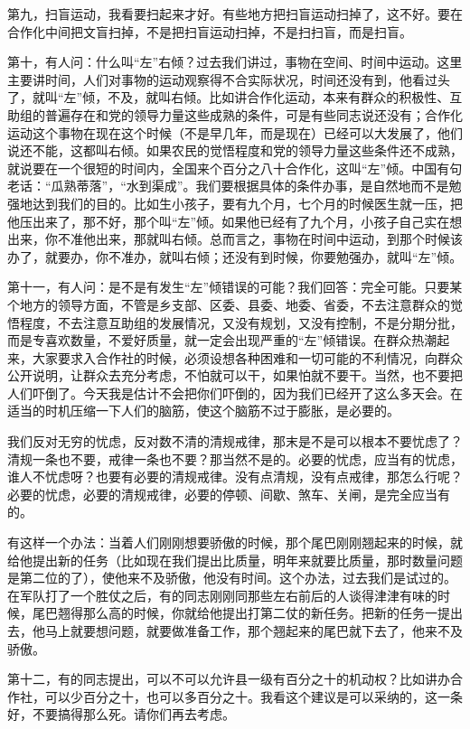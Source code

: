 第九，扫盲运动，我看要扫起来才好。有些地方把扫盲运动扫掉了，这不好。要在合作化中间把文盲扫掉，不是把扫盲运动扫掉，不是扫扫盲，而是扫盲。

第十，有人问：什么叫“左”右倾？过去我们讲过，事物在空间、时间中运动。这里主要讲时间，人们对事物的运动观察得不合实际状况，时间还没有到，他看过头了，就叫“左”倾，不及，就叫右倾。比如讲合作化运动，本来有群众的积极性、互助组的普遍存在和党的领导力量这些成熟的条件，可是有些同志说还没有；合作化运动这个事物在现在这个时候（不是早几年，而是现在）已经可以大发展了，他们说还不能，这都叫右倾。如果农民的觉悟程度和党的领导力量这些条件还不成熟，就说要在一个很短的时间内，全国来个百分之八十合作化，这叫“左”倾。中国有句老话：“瓜熟蒂落”，“水到渠成”。我们要根据具体的条件办事，是自然地而不是勉强地达到我们的目的。比如生小孩子，要有九个月，七个月的时候医生就一压，把他压出来了，那不好，那个叫“左”倾。如果他已经有了九个月，小孩子自己实在想出来，你不准他出来，那就叫右倾。总而言之，事物在时间中运动，到那个时候该办了，就要办，你不准办，就叫右倾；还没有到时候，你要勉强办，就叫“左”倾。

第十一，有人问：是不是有发生“左”倾错误的可能？我们回答：完全可能。只要某个地方的领导方面，不管是乡支部、区委、县委、地委、省委，不去注意群众的觉悟程度，不去注意互助组的发展情况，又没有规划，又没有控制，不是分期分批，而是专喜欢数量，不爱好质量，就一定会出现严重的“左”倾错误。在群众热潮起来，大家要求入合作社的时候，必须设想各种困难和一切可能的不利情况，向群众公开说明，让群众去充分考虑，不怕就可以干，如果怕就不要干。当然，也不要把人们吓倒了。今天我是估计不会把你们吓倒的，因为我们已经开了这么多天会。在适当的时机压缩一下人们的脑筋，使这个脑筋不过于膨胀，是必要的。

我们反对无穷的忧虑，反对数不清的清规戒律，那末是不是可以根本不要忧虑了？清规一条也不要，戒律一条也不要？那当然不是的。必要的忧虑，应当有的忧虑，谁人不忧虑呀？也要有必要的清规戒律。没有点清规，没有点戒律，那怎么行呢？必要的忧虑，必要的清规戒律，必要的停顿、间歇、煞车、关闸，是完全应当有的。

有这样一个办法：当着人们刚刚想要骄傲的时候，那个尾巴刚刚翘起来的时候，就给他提出新的任务（比如现在我们提出比质量，明年来就要比质量，那时数量问题是第二位的了），使他来不及骄傲，他没有时间。这个办法，过去我们是试过的。在军队打了一个胜仗之后，有的同志刚刚同那些左右前后的人谈得津津有味的时候，尾巴翘得那么高的时候，你就给他提出打第二仗的新任务。把新的任务一提出去，他马上就要想问题，就要做准备工作，那个翘起来的尾巴就下去了，他来不及骄傲。

第十二，有的同志提出，可以不可以允许县一级有百分之十的机动权？比如讲办合作社，可以少百分之十，也可以多百分之十。我看这个建议是可以采纳的，这一条好，不要搞得那么死。请你们再去考虑。

